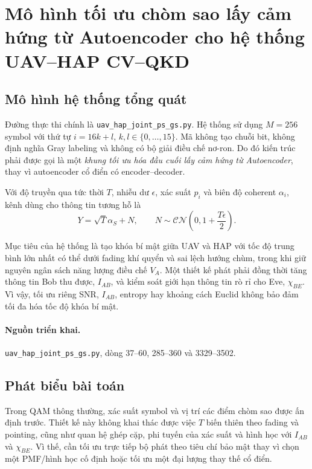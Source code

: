 \section{Mô hình tối ưu chòm sao lấy cảm hứng từ Autoencoder cho hệ thống UAV--HAP CV--QKD}
\label{sec:uav_hap_ps_gs}

\subsection{Mô hình hệ thống tổng quát}

Đường thực thi chính là \texttt{uav\_hap\_joint\_ps\_gs.py}. Hệ thống sử dụng \(M=256\) symbol với thứ tự \(i=16k+l\), \(k,l\in\{0,\ldots,15\}\). Mã không tạo chuỗi bit, không định nghĩa Gray labeling và không có bộ giải điều chế nơ-ron. Do đó kiến trúc phải được gọi là một \emph{khung tối ưu hóa đầu cuối lấy cảm hứng từ Autoencoder}, thay vì autoencoder cổ điển có encoder--decoder.

Với độ truyền qua tức thời \(T\), nhiễu dư \(\epsilon\), xác suất \(p_i\) và biên độ coherent \(\alpha_i\), kênh dùng cho thông tin tương hỗ là
\begin{equation}
Y=\sqrt{T}\alpha_S+N,\qquad
N\sim\mathcal{CN}\!\left(0,1+\frac{T\epsilon}{2}\right).
\end{equation}

Mục tiêu của hệ thống là tạo khóa bí mật giữa UAV và HAP với tốc độ trung bình lớn nhất có thể dưới fading khí quyển và sai lệch hướng chùm, trong khi giữ nguyên ngân sách năng lượng điều chế \(V_A\). Một thiết kế phát phải đồng thời tăng thông tin Bob thu được, \(I_{AB}\), và kiểm soát giới hạn thông tin rò rỉ cho Eve, \(\chi_{BE}\). Vì vậy, tối ưu riêng SNR, \(I_{AB}\), entropy hay khoảng cách Euclid không bảo đảm tối đa hóa tốc độ khóa bí mật.

\paragraph{Nguồn triển khai.} \texttt{uav\_hap\_joint\_ps\_gs.py}, dòng 37--60, 285--360 và 3329--3502.

\subsection{Phát biểu bài toán}

Trong QAM thông thường, xác suất symbol và vị trí các điểm chòm sao được ấn định trước. Thiết kế này không khai thác được việc \(T\) biến thiên theo fading và pointing, cũng như quan hệ ghép cặp, phi tuyến của xác suất và hình học với \(I_{AB}\) và \(\chi_{BE}\). Vì thế, cần tối ưu trực tiếp bộ phát theo tiêu chí bảo mật thay vì chọn một PMF/hình học cố định hoặc tối ưu một đại lượng thay thế cổ điển.

